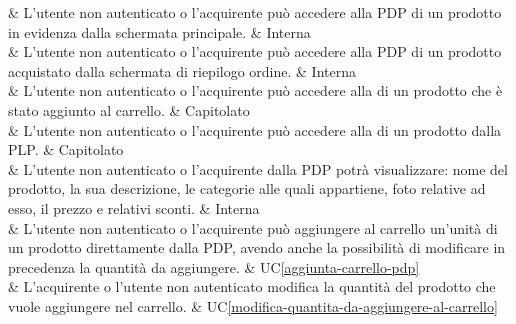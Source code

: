  & L'utente non autenticato o l'acquirente può accedere alla PDP di un prodotto in evidenza dalla schermata principale. & Interna \\

 & L'utente non autenticato o l'acquirente può accedere alla PDP di un prodotto acquistato dalla schermata di riepilogo ordine. & Interna \\

 & L'utente non autenticato o l'acquirente può accedere alla  di un prodotto che è stato aggiunto al carrello. & Capitolato \\

 & L'utente non autenticato o l'acquirente può accedere alla  di un prodotto dalla PLP. & Capitolato \\

 & L'utente non autenticato o l'acquirente dalla PDP potrà visualizzare: nome del prodotto, la sua descrizione, le categorie alle quali appartiene, foto relative ad esso, il prezzo e relativi sconti. & Interna \\

 & L'utente non autenticato o l'acquirente può aggiungere al carrello un'unità di un prodotto direttamente dalla PDP, avendo anche la possibilità di modificare in precedenza la quantità da aggiungere. & UC\ref{aggiunta-carrello-pdp} \\

 & L'acquirente o l'utente non autenticato modifica la quantità del prodotto che vuole aggiungere nel carrello. & UC\ref{modifica-quantita-da-aggiungere-al-carrello} \\

